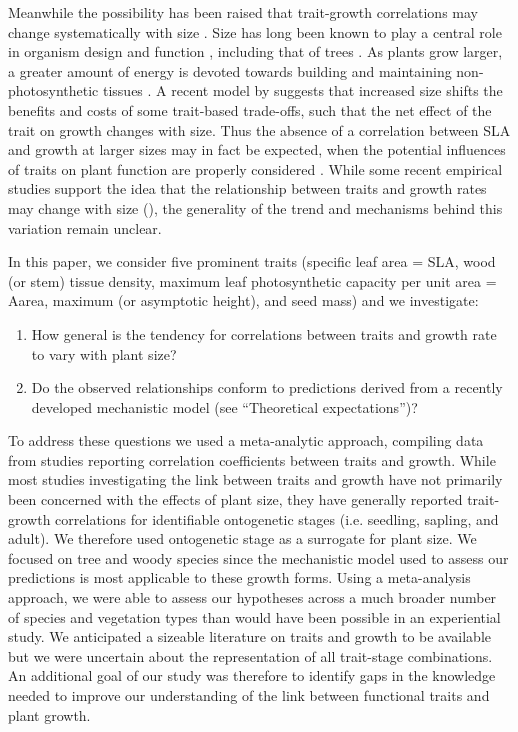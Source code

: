 \documentclass[a4paper,11pt]{article}
\begin{document}
Meanwhile the possibility has been raised that trait-growth correlations may change systematically with size \citep{King-1999, Falster:2011ii, Ruger:2012jv, Iida:2014ep, Iida:2014hq}. Size has long been known to play a central role in organism design and function \citep{Vogel:1988ux, Vogel:2003wb}, including that of trees \citep{Farnsworth:1995im, Givnish:1995ta, King-2011}. As plants grow larger, a greater amount of energy is devoted towards building and maintaining non-photosynthetic tissues \citep{Givnish:1995ta,King-2011}. A recent model by \citet{Falster:2011ii} suggests that increased size shifts the benefits and costs of some trait-based trade-offs, such that the net effect of the trait on growth changes with size. Thus the absence of a correlation between SLA and growth at larger sizes may in fact be expected, when the potential influences of traits on plant function are properly considered \citep{Falster:2011ii}. While some recent empirical studies support the idea that the relationship between traits and growth rates may change with size (\citealt{Iida:2014ep, Iida:2014hq}), the generality of the trend and mechanisms behind this variation remain unclear.

In this paper, we consider five prominent traits (specific leaf area = SLA, wood (or stem) tissue density, maximum leaf photosynthetic capacity per unit area = Aarea, maximum (or asymptotic height), and seed mass) and we investigate:
\begin{enumerate}
  \item How general is the tendency for correlations between traits and growth rate to vary with plant size?
  \item Do the observed relationships conform to predictions derived from a recently developed mechanistic model \citep{Falster:2011ii} (see ``Theoretical expectations'')?
\end{enumerate}
To address these questions we used a meta-analytic approach, compiling data from studies reporting correlation coefficients between traits and growth. While most studies investigating the link between traits and growth have not primarily been concerned with the effects of plant size, they have generally reported trait-growth correlations for identifiable ontogenetic stages (i.e. seedling, sapling, and adult). We therefore used ontogenetic stage as a surrogate for plant size. We focused on tree and woody species since the mechanistic model used to assess our predictions is most applicable to these growth forms.
Using a meta-analysis approach, we were able to assess our hypotheses across a much broader number of species and vegetation types than would have been possible in an experiential study. We anticipated a sizeable literature on traits and growth to be available but we were uncertain about the representation of all trait-stage combinations. An additional goal of our study was therefore to identify gaps in the knowledge needed to improve our understanding of the link between functional traits and plant growth.
\end{document}
